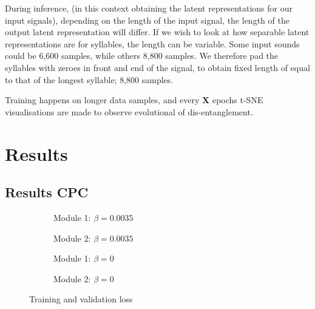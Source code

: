 		During inference, (in this context obtaining the latent representations for our input signals), depending on the length of the input signal, the length of the output latent representation will differ.
		If we wish to look at how separable latent representations are for syllables, the length can be variable. Some input sounds could be 6,600 samples, while others 8,800 samples. We therefore pad the syllables with zeroes in front and end of the signal, to obtain fixed length of equal to that of the longest syllable; 8,800 samples.
		
		Training happens on longer data samples, and every \textbf{X} epochs t-SNE visualisations are made to observe evolutional of dis-entanglement.
		

\section{Results}

	\subsection{Results CPC}
	
	\begin{figure}[h] %
		\centering
				\begin{subfigure}[b]{0.45\textwidth}
			\centering
			
			\caption{Module 1: $\beta=0.0035$}
		\end{subfigure}
		\hfill
		\begin{subfigure}[b]{0.45\textwidth}
			\centering
			
			\caption{Module 2: $\beta=0.0035$}
		\end{subfigure}		
		\hfill
		
		\begin{subfigure}[b]{0.45\textwidth}
			\centering
			
			\caption{Module 1: $\beta=0$}
		\end{subfigure}
		\hfill
		\begin{subfigure}[b]{0.45\textwidth}
			\centering
			
			\caption{Module 2: $\beta=0$}
		\end{subfigure}
		
		\caption{Training and validation loss}

	\end{figure}

	
	
